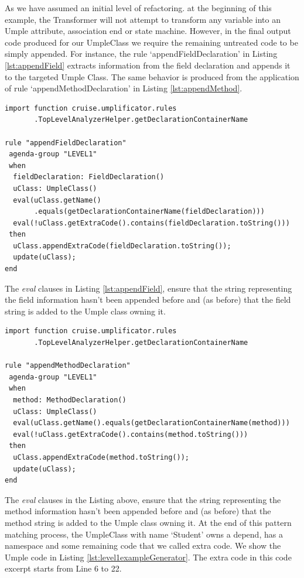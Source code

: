 As we have assumed an initial level of refactoring. at the beginning of this example, the Transformer will not attempt to transform any variable into an Umple attribute, association end or state machine. However, in the final output code produced for our UmpleClass we require the remaining untreated code to be simply appended. For instance, the rule `appendFieldDeclaration' in Listing \ref{lst:appendField} extracts information from the field declaration and appends it to the targeted Umple Class. The same behavior is produced from the application of rule `appendMethodDeclaration' in Listing \ref{lst:appendMethod}.

\begin{lstlisting}[language={drools},label={lst:appendField}, caption=Rule appendFieldDeclaration]
import function cruise.umplificator.rules
       .TopLevelAnalyzerHelper.getDeclarationContainerName
       
rule "appendFieldDeclaration"
 agenda-group "LEVEL1" 
 when
  fieldDeclaration: FieldDeclaration()
  uClass: UmpleClass()
  eval(uClass.getName()
       .equals(getDeclarationContainerName(fieldDeclaration)))
  eval(!uClass.getExtraCode().contains(fieldDeclaration.toString()))
 then
  uClass.appendExtraCode(fieldDeclaration.toString());
  update(uClass);
end
\end{lstlisting}

The \textit{eval} clauses in Listing \ref{lst:appendField}, ensure that the string representing the field information hasn't been appended before and (as before) that the field string is added to the Umple class owning it.

\begin{lstlisting}[language={drools},label={lst:appendMethod}, caption=Rule appendMethodDeclaration]
import function cruise.umplificator.rules
       .TopLevelAnalyzerHelper.getDeclarationContainerName
       
rule "appendMethodDeclaration"
 agenda-group "LEVEL1" 
 when
  method: MethodDeclaration()
  uClass: UmpleClass()
  eval(uClass.getName().equals(getDeclarationContainerName(method)))
  eval(!uClass.getExtraCode().contains(method.toString()))
 then
  uClass.appendExtraCode(method.toString());
  update(uClass);
end
\end{lstlisting}

The \textit{eval} clauses in the Listing above, ensure that the string representing the method information hasn't been appended before and (as before) that the method string is added to the Umple class owning it. 
At the end of this pattern matching process, the UmpleClass with name `Student' owns a depend, has a namespace and some remaining code that we called extra code. We show the Umple code in Listing \ref{lst:level1exampleGenerator}. The extra code in this code excerpt starts from Line 6 to 22.

